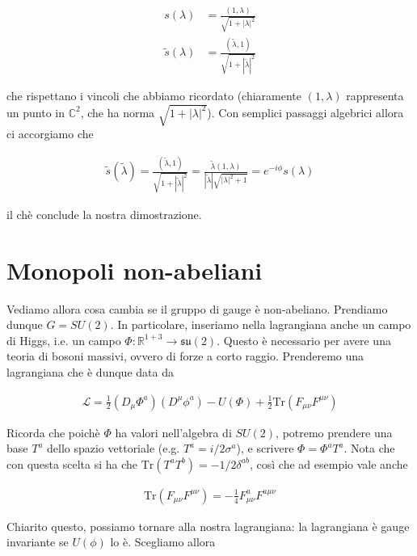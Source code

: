 \documentclass{report}
\begin{document}
\begin{align}
    s(\lambda) &= \frac{(1, \lambda)}{\sqrt{1 + |\lambda|^2}} \\
    \tilde{s}(\lambda) &= \frac{(\tilde{\lambda}, 1)}{\sqrt{1 + |\tilde{\lambda}|^2}} 
\end{align}

che rispettano i vincoli che abbiamo ricordato (chiaramente \((1, \lambda)\) rappresenta un punto in \( \mathbb{C}^2\), che ha norma \(\sqrt{1+|\lambda|^2}\)). Con semplici passaggi algebrici allora ci accorgiamo che 

\begin{align}
    \tilde{s}(\tilde{\lambda}) = \frac{(\tilde{\lambda}, 1)}{\sqrt{1 + |\tilde{\lambda}|^2}} = \frac{\tilde{\lambda}(1, \lambda)}{|\tilde{\lambda}|\sqrt{|\lambda|^2 + 1}} = e^{-i\phi} s(\lambda)
\end{align}

il chè conclude la nostra dimostrazione. 


\section{Monopoli non-abeliani}

Vediamo allora cosa cambia se il gruppo di gauge è non-abeliano. Prendiamo dunque \(G = SU(2)\). In particolare, inseriamo nella lagrangiana anche un campo di Higgs, i.e. un campo \(\Phi: \mathbb{R}^{1+3} \rightarrow \mathfrak{su}(2)\). Questo è necessario per avere una teoria di bosoni massivi, ovvero di forze a corto raggio. Prenderemo una lagrangiana che è dunque data da 


\begin{align}
    \mathcal{L} = \frac{1}{2}(D_\mu\Phi^a)(D^{\mu}\phi^a) - U(\Phi) + \frac{1}{2}\text{Tr}(F_{\mu\nu}F^{\mu\nu})
\end{align}

Ricorda che poichè \(\Phi\) ha valori nell'algebra di \(SU(2)\), potremo prendere una base \(T^a\) dello spazio vettoriale (e.g. \(T^a = i/2 \sigma^a\)), e scrivere \(\Phi = \Phi^a T^a\). Nota che con questa scelta si ha che \(\text{Tr}(T^aT^b) = -1/2\delta^{ab}\), così che ad esempio vale anche 

\begin{align}
    \text{Tr}(F_{\mu\nu}F^{\mu\nu}) = -\frac{1}{4}F^a_{\mu\nu}F^{a \mu\nu}
\end{align}

Chiarito questo, possiamo tornare alla nostra lagrangiana: la lagrangiana è gauge invariante se \(U(\phi)\) lo è. Scegliamo allora 
\end{document}
